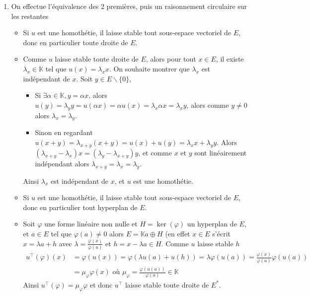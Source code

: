 \documentclass[answers,11pt]{exam}
\newcommand{\KK}{\mathbb{K}}
\begin{document}
\begin{questions}
\begin{solution}
	\begin{enumerate}[label=\alph*)]
		\item On effectue l'équivalence des 2 premières, puis un raisonnement circulaire sur les restantes \begin{itemize}
			\item[$\romannumeral 1) \implies \romannumeral 2)$] Si $u$ est une homothétie, il laisse stable tout sous-espace vectoriel de $E$, donc en particulier toute droite de $E$.
			\item[$\romannumeral 2) \implies \romannumeral 1)$] Comme $u$ laisse stable toute droite de $E$, alors pour tout $x \in E$, il existe $\lambda_x \in \KK$ tel que  $u(x)=\lambda_x x$. On souhaite montrer que $\lambda_x$ est indépendant de $x$. Soit $y \in E\backslash\{0\}$,
			\begin{itemize}[label=$\ast$]
				\item Si $\exists \alpha \in \KK, y=\alpha x $, alors $u(y)=\lambda_y y = u(\alpha x)= \alpha u(x)=\lambda_x \alpha x =\lambda_x y $, alors comme $y\neq 0$ alors $\lambda_x=\lambda_y$.
				\item Sinon en regardant $u(x+y)=\lambda_{x+y}(x+y)=u(x)+u(y)=\lambda_x x+\lambda_y y$. Alors $(\lambda_{x+y} - \lambda_x)x = (\lambda_y - \lambda_{x+y})y$, et comme $x$ et $y$ sont linéairement indépendant alors $\lambda_{x+y}=\lambda_x=\lambda_y$.
			\end{itemize}
			Ainsi $\lambda_x$ est indépendant de $x$, et $u$ est une homothétie.
			\item[$\romannumeral 1) \implies \romannumeral 3)$] Si $u$ est une homothétie, il laisse stable tout sous-espace vectoriel de $E$, donc en particulier tout hyperplan de $E$.
			\item[$\romannumeral 3) \implies \romannumeral 4)$] Soit $\varphi$ une forme linéaire non nulle et $H=\ker(\varphi)$ un hyperplan de $E$, et $a \in E$ tel que $\varphi(a) \neq 0$ alors $E=\KK a \oplus H$ (en effet $x\in E$ s'écrit $x=\lambda a + h$ avec $\lambda=\frac{\varphi(x)}{\varphi(a)}$ et $h=x-\lambda a \in H$. Comme $u$ laisse stable $h$
			\begin{align*}
				u^{\intercal}(\varphi)(x)&=\varphi(u(x))=\varphi(\lambda u(a)+u(h))=\lambda \varphi(u(a))=\frac{\varphi(x)}{\varphi(a)} \varphi(u(a)) \\
				&=\mu_{\varphi} \varphi(x) \text{ où } \mu_{\varphi}=\frac{\varphi(u(a))}{\varphi(a)} \in \KK
			\end{align*}
			Ainsi $u^{\intercal}(\varphi)=\mu_{\varphi} \varphi$ et donc $u^{\intercal}$ laisse stable toute droite de $E^{*}$.

\end{itemize}
\end{enumerate}
\end{solution}
\end{questions}
\end{document}
